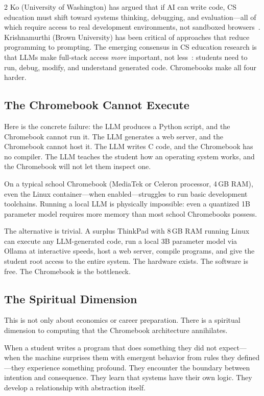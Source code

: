 \documentclass[11pt, a4paper]{article}
\begin{document}
\begin{multicols}{2}
Ko (University of Washington) has argued that if AI can write code, CS education must shift toward systems thinking, debugging, and evaluation---all of which require access to real development environments, not sandboxed browsers~\citep{denny2024computing}. Krishnamurthi (Brown University) has been critical of approaches that reduce programming to prompting. The emerging consensus in CS education research is that LLMs make full-stack access \emph{more} important, not less~\citep{prather2024robots}: students need to run, debug, modify, and understand generated code. Chromebooks make all four harder.

\subsection{The Chromebook Cannot Execute}

Here is the concrete failure: the LLM produces a Python script, and the Chromebook cannot run it. The LLM generates a web server, and the Chromebook cannot host it. The LLM writes C code, and the Chromebook has no compiler. The LLM teaches the student how an operating system works, and the Chromebook will not let them inspect one.

On a typical school Chromebook (MediaTek or Celeron processor, 4\,GB RAM), even the Linux container---when enabled---struggles to run basic development toolchains. Running a local LLM is physically impossible: even a quantized 1B parameter model requires more memory than most school Chromebooks possess.

The alternative is trivial. A surplus ThinkPad with 8\,GB RAM running Linux can execute any LLM-generated code, run a local 3B parameter model via Ollama at interactive speeds, host a web server, compile programs, and give the student root access to the entire system. The hardware exists. The software is free. The Chromebook is the bottleneck.

\subsection{The Spiritual Dimension}

This is not only about economics or career preparation. There is a spiritual dimension to computing that the Chromebook architecture annihilates.

When a student writes a program that does something they did not expect---when the machine surprises them with emergent behavior from rules they defined---they experience something profound. They encounter the boundary between intention and consequence. They learn that systems have their own logic. They develop a relationship with abstraction itself.


\end{multicols}
\end{document}

